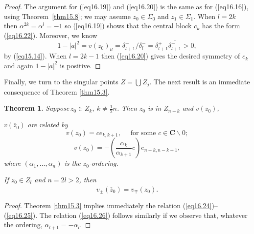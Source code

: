 \documentclass{surv-l}
\theoremstyle{plain}
\newtheorem{theorem}{Theorem}[section]
\theoremstyle{definition}
\numberwithin{equation}{chapter}
\begin{document}
\begin{proof}
The argument for (\ref{eq16.19}) and (\ref{eq16.20}) is the same as for (\ref{eq16.16}), using Theorem~\ref{thm15.8}; we may assume $z_{0}\in\Sigma_{0}$ and $z_{1}\in\Sigma_{1}$. When $l=2k$ then $\alpha^{2k}=\alpha^{l}=-1$ so (\ref{eq16.19}) shows that the central block $c_{k}$ has the form (\ref{eq16.22}). Moreover, we know
\begin{equation*}
1-|a|^{2}=v(z_{0})_{ll}=\delta_{l+1}^{+}/\delta_{l}^{-}=\delta_{l+1}^{+}\overline{\delta_{l+1}^{+}}>0,
\end{equation*}
by (\ref{eq15.14}). When $l=2k-1$ then (\ref{eq16.20}) gives the desired symmetry of $c_{k}$ and again $1-|a|^{2}$ is positive.
\end{proof}
Finally, we turn to the singular points $Z=\bigcup Z_{j}$. The next result is an immediate consequence of Theorem \ref{thm15.3}.
\setcounter{theorem}{22}
\begin{theorem}\label{thm16.23}
Suppose\,$z_{0}\in Z_{k},\ k\neq\frac{1}{2}n$.  Then $\overline{z}_{0}$ is in $Z_{n-k}$  and $v(z_{0})$,

$v(\overline{z}_{0})$ are related by
\setcounter{equation}{23}
\begin{equation}\label{eq16.24}
v(z_{0})=ce_{k,k+1},\quad  \text{ for some } c\in \mathbf{C}\backslash 0;
\end{equation}
\begin{equation}\label{eq16.25}
v(\overline{z}_{0})=-\left(\frac{\alpha_{k}}{\alpha_{k+1}}\overline{c}\right)e_{n-k,n-k+1},
\end{equation}
where $(\alpha_{1},\ldots,\alpha_{n})$ is the $z_{0}$-ordering.

If $z_{0}\in Z_{l}$ and $n=2l>2$, then
\begin{equation}\label{eq16.26}
v_{\pm}(\overline{z}_{0})=\overline{v_{\mp}(z_{0})}.
\end{equation}
\end{theorem}

\begin{proof}
Theorem \ref{thm15.3} implies immediately the relation (\ref{eq16.24})--(\ref{eq16.25}). The relation (\ref{eq16.26}) follows similarly if we observe that, whatever the ordering, $\alpha_{l+1}=-\alpha_{l}$.
\end{proof}
\end{document}
